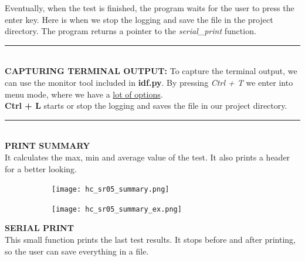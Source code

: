\documentclass[14pt]{article}
\begin{document}
\begin{normalsize}
		\noindent Eventually, when the test is finished, the program waits for the user to press the enter key. Here is when we stop the logging and save the file in the project directory. The program returns a pointer to the \textit{serial\_print} function.\\
		
		\noindent\rule{1\textwidth}{0.4pt}\vspace{5pt}\\
		\textbf{CAPTURING TERMINAL OUTPUT: }To capture the terminal output, we can use the monitor tool included in \textbf{idf.py}. By pressing \textit{Ctrl + T} we enter into menu mode, where we have a \href{https://docs.espressif.com/projects/esp-idf/en/stable/esp32/api-guides/tools/idf-monitor.html}{lot of options}. \\
		
		\noindent \textbf{Ctrl + L} starts or stop the logging and saves the file in our project directory.\\
		\noindent\rule{1\textwidth}{0.4pt}\vspace{5pt}\\
	
		
		\large \textbf{PRINT SUMMARY}\label{SUMMARY}\normalsize\\
		
		It calculates the max, min and average value of the test. It also prints a header for a better looking.\\
		
		\begin{figure}[h]
			\centering
			\begin{subfigure}{.45\textwidth}
				\centering
				\texttt{[image: hc\_sr05\_summary.png]}
			\end{subfigure}
			\begin{subfigure}{.45\textwidth}
				\centering
				\texttt{[image: hc\_sr05\_summary\_ex.png]}
			\end{subfigure}
		\end{figure}
		
		\vspace{20pt}
		
		\large \textbf{SERIAL PRINT}\label{SERIAL_PRINT}\normalsize\\
		
		This small function prints the last test results. It stops before and after printing, so the user can save everything in a file.\\
		

\end{normalsize}
\end{document}
